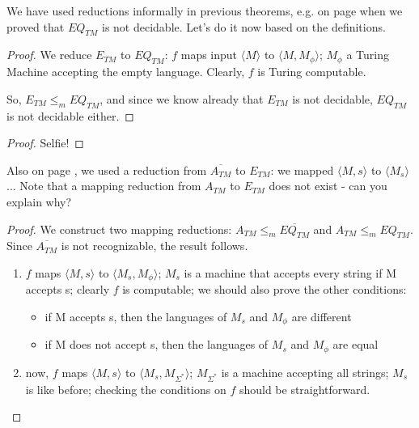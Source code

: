 We have used reductions informally in previous theorems, e.g. on page
\pageref{reduction1} when we proved that $EQ_{TM}$ is not decidable.
Let's do it now based on the definitions.

\begin{proof}
We reduce $E_{TM}$ to $EQ_{TM}$: $f$ maps input $\langle M \rangle$ to
$\langle M,M_\phi \rangle$; $M_\phi$ a Turing Machine accepting the
empty language. Clearly, $f$ is Turing computable.

So, $E_{TM} \leq_m EQ_{TM}$, and since we know already that $E_{TM}$
is not decidable, $EQ_{TM}$ is not decidable either.
\end{proof}


\begin{proof}
Selfie!
\end{proof}


Also on page \pageref{nonreductie1}, we used a reduction from
$\overline{A_{TM}}$ to $E_{TM}$: we mapped $\langle M,s \rangle$ to
$\langle M_s \rangle$ ...  Note that a mapping reduction from
$A_{TM}$ to $E_{TM}$ does not exist - can you explain why?


\begin{proof}
We construct two mapping reductions: $A_{TM} \leq_m
\overline{EQ_{TM}}$ and $A_{TM} \leq_m EQ_{TM}$. Since
$\overline{A_{TM}}$ is not recognizable, the result follows.
\begin{enumerate}
\item $f$ maps $\langle M,s \rangle$ to $\langle M_s,M_\phi \rangle$;
  $M_s$ is a machine that accepts every string if M accepts s; clearly
  $f$ is computable; we should also prove the other conditions:
\begin{itemize}
\item if M accepts s, then the languages of $M_s$ and $M_\phi$ are
  different
\item if M does not accept s, then the languages of $M_s$ and $M_\phi$
  are equal
\end{itemize}

\item now, $f$ maps $\langle M,s \rangle$ to $\langle M_s,M_{\Sigma^*}
  \rangle$; $M_{\Sigma^*}$ is a machine accepting all strings; $M_s$
  is like before; checking the conditions on $f$ should be
straightforward.
\end{enumerate}
\end{proof}



